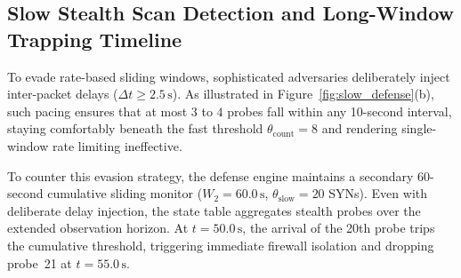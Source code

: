 \subsection{Slow Stealth Scan Detection and Long-Window Trapping Timeline}
To evade rate-based sliding windows, sophisticated adversaries deliberately inject inter-packet delays ($\Delta t \ge 2.5\,\text{s}$). As illustrated in Figure~\ref{fig:slow_defense}(b), such pacing ensures that at most $3$ to $4$ probes fall within any 10-second interval, staying comfortably beneath the fast threshold $\theta_{\text{count}} = 8$ and rendering single-window rate limiting ineffective.

To counter this evasion strategy, the defense engine maintains a secondary 60-second cumulative sliding monitor ($W_2 = 60.0\,\text{s}$, $\theta_{\text{slow}} = 20$ SYNs). Even with deliberate delay injection, the state table aggregates stealth probes over the extended observation horizon. At $t=50.0\,\text{s}$, the arrival of the 20th probe trips the cumulative threshold, triggering immediate firewall isolation and dropping probe~21 at $t=55.0\,\text{s}$.

